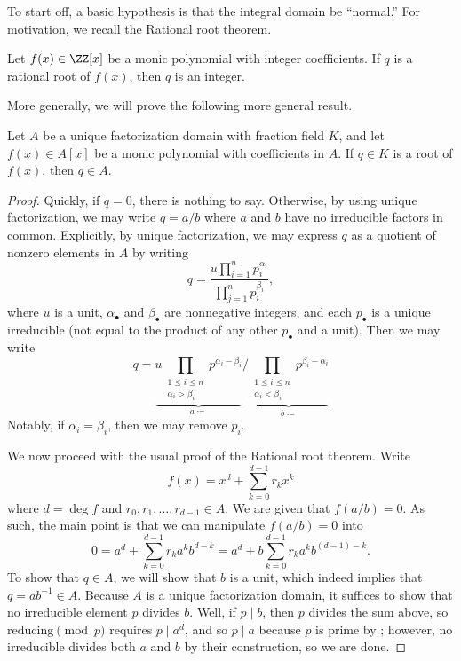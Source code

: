 \documentclass[../notes.tex]{subfiles}
\begin{document}
To start off, a basic hypothesis is that the integral domain be ``normal.'' For motivation, we recall the Rational root theorem.
\begin{theorem}
	Let $f(x)\in\ZZ[x]$ be a monic polynomial with integer coefficients. If $q$ is a rational root of $f(x)$, then $q$ is an integer.
\end{theorem}
More generally, we will prove the following more general result.
\begin{theorem} \label{thm:rrt-for-ufd}
	Let $A$ be a unique factorization domain with fraction field $K$, and let $f(x)\in A[x]$ be a monic polynomial with coefficients in $A$. If $q\in K$ is a root of $f(x)$, then $q\in A$.
\end{theorem}
\begin{proof}
	Quickly, if $q=0$, there is nothing to say. Otherwise, by using unique factorization, we may write $q=a/b$ where $a$ and $b$ have no irreducible factors in common. Explicitly, by unique factorization, we may express $q$ as a quotient of nonzero elements in $A$ by writing
	\[q=\dfrac{u\prod_{i=1}^np_i^{\alpha_i}}{\prod_{j=1}^np_i^{\beta_i}},\]
	where $u$ is a unit, $\alpha_\bullet$ and $\beta_\bullet$ are nonnegative integers, and each $p_\bullet$ is a unique irreducible (not equal to the product of any other $p_\bullet$ and a unit). Then we may write
	\[q=\underbrace{u\prod_{\substack{1\le i\le n\\\alpha_i>\beta_i}}p^{\alpha_i-\beta_i}}_{a\coloneqq}\bigg/\underbrace{\prod_{\substack{1\le i\le n\\\alpha_i<\beta_i}}p^{\beta_i-\alpha_i}}_{b\coloneqq}\]
	Notably, if $\alpha_i=\beta_i$, then we may remove $p_i$.

	We now proceed with the usual proof of the Rational root theorem. Write
	\[f(x)=x^d+\sum_{k=0}^{d-1}r_kx^k\]
	where $d=\deg f$ and $r_0,r_1,\ldots,r_{d-1}\in A$. We are given that $f(a/b)=0$. As such, the main point is that we can manipulate $f(a/b)=0$ into
	\[0=a^d+\sum_{k=0}^{d-1}r_ka^kb^{d-k}=a^d+b\sum_{k=0}^{d-1}r_ka^kb^{(d-1)-k}.\]
	To show that $q\in A$, we will show that $b$ is a unit, which indeed implies that $q=ab^{-1}\in A$. Because $A$ is a unique factorization domain, it suffices to show that no irreducible element $p$ divides $b$. Well, if $p\mid b$, then $p$ divides the sum above, so reducing$\pmod p$ requires $p\mid a^d$, and so $p\mid a$ because $p$ is prime by ; however, no irreducible divides both $a$ and $b$ by their construction, so we are done.
\end{proof}
\end{document}
